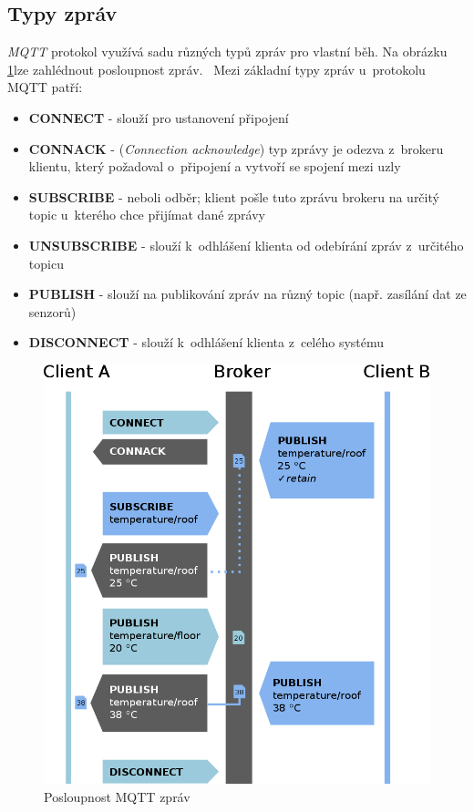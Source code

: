 \subsection*{Typy zpráv}
\emph{MQTT} protokol využívá sadu různých typů zpráv pro vlastní běh. Na obrázku \ref{figure:mqtt_flow}lze zahlédnout posloupnost zpráv.~\cite{wiki:mqtt_broker}
Mezi základní typy zpráv u~protokolu MQTT patří:
\begin{itemize}
  \item \textbf{CONNECT} - slouží pro ustanovení připojení
  \item \textbf{CONNACK} - (\emph{Connection acknowledge}) typ zprávy je odezva z~brokeru klientu, který požadoval o~připojení a vytvoří se spojení mezi uzly
  \item \textbf{SUBSCRIBE} - neboli odběr; klient pošle tuto zprávu brokeru na určitý topic u~kterého chce přijímat dané zprávy
  \item \textbf{UNSUBSCRIBE} - slouží k~odhlášení klienta od odebírání zpráv z~určitého topicu
  \item \textbf{PUBLISH} - slouží na publikování zpráv na různý topic (např. zasílání dat ze senzorů)
  \item \textbf{DISCONNECT} - slouží k~odhlášení klienta z~celého systému
\end{itemize}

\begin{figure}[ht]
  \centering
  \includegraphics[width=.7 \linewidth]{obrazky-figures/mqtt_flow.png}
  \caption{Posloupnost MQTT zpráv}
  \label{figure:mqtt_flow}
\end{figure}

